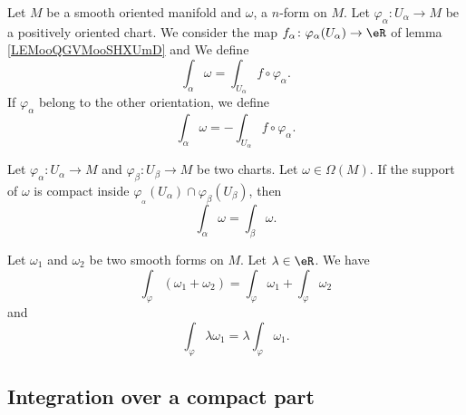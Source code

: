 \begin{definition}	\label{DEFooIKFYooKxKidt}
	Let \( M \) be a smooth oriented manifold and \( \omega\), a \( n\)-form on \( M\). Let \(\varphi_{\alpha} \colon U_{\alpha}\to M  \) be a positively oriented chart. We consider the map \(f_{\alpha} \colon \varphi_{\alpha}(U_{\alpha})\to \eR  \) of lemma \ref{LEMooQGVMooSHXUmD} and We define
	\begin{equation}
		\int_{\alpha}\omega = \int_{U_{\alpha}}f\circ\varphi_{\alpha}.
	\end{equation}
	If \( \varphi_{\alpha}\) belong to the other orientation, we define
	\begin{equation}
		\int_{\alpha}\omega = -\int_{U_{\alpha}}f\circ\varphi_{\alpha}.
	\end{equation}
\end{definition}

\begin{proposition}	\label{PROPooXTVAooVvEiTh}
	Let \(\varphi_{\alpha} \colon U_{\alpha}\to M  \) and \(\varphi_{\beta} \colon U_{\beta}\to M  \) be two charts. Let \( \omega\in\Omega(M)\). If the support of \( \omega\) is compact inside \( \varphi_{_\alpha}(U_{\alpha})\cap \varphi_{\beta}(U_{\beta})\), then
	\begin{equation}
		\int_{\alpha}\omega=\int_{\beta}\omega.
	\end{equation}
\end{proposition}

\begin{proposition}	\label{PROPooDJPYooEnXUAc}
	Let \( \omega_1\) and \( \omega_2\) be two smooth forms on \( M\). Let \( \lambda\in \eR\). We have
	\begin{equation}
		\int_{\varphi}(\omega_1+\omega_2)=\int_{\varphi}\omega_1+\int_{\varphi}\omega_2
	\end{equation}
	and
	\begin{equation}
		\int_{\varphi}\lambda\omega_1=\lambda\int_{\varphi}\omega_1.
	\end{equation}
\end{proposition}


\subsection{Integration over a compact part}

